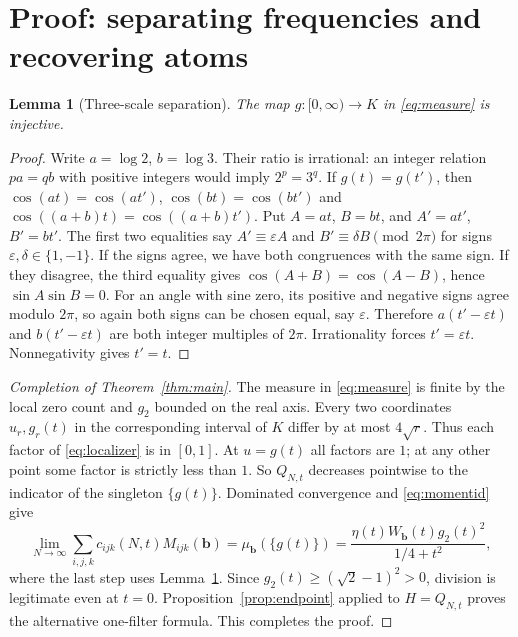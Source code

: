 \documentclass[11pt]{article}
\newtheorem{lemma}[theorem]{Lemma}
\theoremstyle{remark}\newtheorem{remark}[theorem]{Remark}
\newcommand{\bb}{\boldsymbol b}
\begin{document}
\section{Proof: separating frequencies and recovering atoms}
\begin{lemma}[Three-scale separation]\label{lem:separate}
The map $g:[0,\infty)\to K$ in \eqref{eq:measure} is injective.
\end{lemma}
\begin{proof}
Write $a=\log2$, $b=\log3$. Their ratio is irrational: an integer relation $pa=qb$ with positive integers would imply $2^p=3^q$. If $g(t)=g(t')$, then $\cos(at)=\cos(at')$, $\cos(bt)=\cos(bt')$ and $\cos((a+b)t)=\cos((a+b)t')$. Put $A=at$, $B=bt$, and $A'=at'$, $B'=bt'$. The first two equalities say $A'\equiv\varepsilon A$ and $B'\equiv\delta B\pmod{2\pi}$ for signs $\varepsilon,\delta\in\{1,-1\}$. If the signs agree, we have both congruences with the same sign. If they disagree, the third equality gives $\cos(A+B)=\cos(A-B)$, hence $\sin A\sin B=0$. For an angle with sine zero, its positive and negative signs agree modulo $2\pi$, so again both signs can be chosen equal, say $\varepsilon$. Therefore $a(t'-\varepsilon t)$ and $b(t'-\varepsilon t)$ are both integer multiples of $2\pi$. Irrationality forces $t'=\varepsilon t$. Nonnegativity gives $t'=t$.
\end{proof}
\begin{proof}[Completion of Theorem~\ref{thm:main}]
The measure in \eqref{eq:measure} is finite by the local zero count and $g_2$ bounded on the real axis. Every two coordinates $u_r,g_r(t)$ in the corresponding interval of $K$ differ by at most $4\sqrt r$. Thus each factor of \eqref{eq:localizer} is in $[0,1]$. At $u=g(t)$ all factors are $1$; at any other point some factor is strictly less than $1$. So $Q_{N,t}$ decreases pointwise to the indicator of the singleton $\{g(t)\}$. Dominated convergence and \eqref{eq:momentid} give
\[
 \lim_{N\to\infty}\sum_{i,j,k}c_{ijk}(N,t)M_{ijk}(\bb)
 =\mu_{\bb}(\{g(t)\})=\frac{\eta(t) W_{\bb}(t)g_2(t)^2}{1/4+t^2},
\]
where the last step uses Lemma~\ref{lem:separate}. Since $g_2(t)\ge(\sqrt2-1)^2>0$, division is legitimate even at $t=0$. Proposition~\ref{prop:endpoint} applied to $H=Q_{N,t}$ proves the alternative one-filter formula. This completes the proof.\qedhere
\end{proof}
\end{document}

